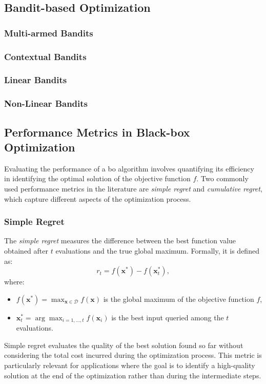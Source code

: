 \subsection{Bandit-based Optimization}
\subsubsection{Multi-armed Bandits}
\subsubsection{Contextual Bandits}
\subsubsection{Linear Bandits}
\subsubsection{Non-Linear Bandits}
\subsection{Performance Metrics in Black-box Optimization}
\label{background:performance_metrics}
Evaluating the performance of a \acf{bo} algorithm involves quantifying its efficiency in identifying the optimal solution of the objective function \( f \). Two commonly used performance metrics in the literature are \emph{simple regret} and \emph{cumulative regret}, which capture different aspects of the optimization process.

\subsubsection{Simple Regret}
The \emph{simple regret} measures the difference between the best function value obtained after \( t \) evaluations and the true global maximum. Formally, it is defined as:
\[
r_t = f(\mathbf{x}^*) - f(\mathbf{x}_t^*),
\]
where:
\begin{itemize}
    \item \( f(\mathbf{x}^*) = \max_{\mathbf{x} \in \mathcal{D}} f(\mathbf{x}) \) is the global maximum of the objective function \( f \),
    \item \( \mathbf{x}_t^* = \arg \max_{i=1,\dots,t} f(\mathbf{x}_i) \) is the best input queried among the \( t \) evaluations.
\end{itemize}

Simple regret evaluates the quality of the best solution found so far without considering the total cost incurred during the optimization process. This metric is particularly relevant for applications where the goal is to identify a high-quality solution at the end of the optimization rather than during the intermediate steps.

